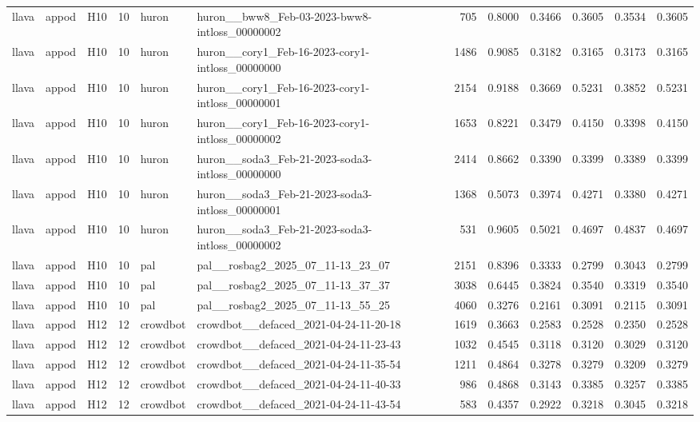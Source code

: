\begin{table}[tbp]
\begin{tabular}{lllrllrrrrrr}
llava & appod & H10 & 10 & huron & huron\_\_bww8\_Feb-03-2023-bww8-intloss\_00000002 & 705 & 0.8000 & 0.3466 & 0.3605 & 0.3534 & 0.3605 \\
llava & appod & H10 & 10 & huron & huron\_\_cory1\_Feb-16-2023-cory1-intloss\_00000000 & 1486 & 0.9085 & 0.3182 & 0.3165 & 0.3173 & 0.3165 \\
llava & appod & H10 & 10 & huron & huron\_\_cory1\_Feb-16-2023-cory1-intloss\_00000001 & 2154 & 0.9188 & 0.3669 & 0.5231 & 0.3852 & 0.5231 \\
llava & appod & H10 & 10 & huron & huron\_\_cory1\_Feb-16-2023-cory1-intloss\_00000002 & 1653 & 0.8221 & 0.3479 & 0.4150 & 0.3398 & 0.4150 \\
llava & appod & H10 & 10 & huron & huron\_\_soda3\_Feb-21-2023-soda3-intloss\_00000000 & 2414 & 0.8662 & 0.3390 & 0.3399 & 0.3389 & 0.3399 \\
llava & appod & H10 & 10 & huron & huron\_\_soda3\_Feb-21-2023-soda3-intloss\_00000001 & 1368 & 0.5073 & 0.3974 & 0.4271 & 0.3380 & 0.4271 \\
llava & appod & H10 & 10 & huron & huron\_\_soda3\_Feb-21-2023-soda3-intloss\_00000002 & 531 & 0.9605 & 0.5021 & 0.4697 & 0.4837 & 0.4697 \\
llava & appod & H10 & 10 & pal & pal\_\_rosbag2\_2025\_07\_11-13\_23\_07 & 2151 & 0.8396 & 0.3333 & 0.2799 & 0.3043 & 0.2799 \\
llava & appod & H10 & 10 & pal & pal\_\_rosbag2\_2025\_07\_11-13\_37\_37 & 3038 & 0.6445 & 0.3824 & 0.3540 & 0.3319 & 0.3540 \\
llava & appod & H10 & 10 & pal & pal\_\_rosbag2\_2025\_07\_11-13\_55\_25 & 4060 & 0.3276 & 0.2161 & 0.3091 & 0.2115 & 0.3091 \\
llava & appod & H12 & 12 & crowdbot & crowdbot\_\_defaced\_2021-04-24-11-20-18 & 1619 & 0.3663 & 0.2583 & 0.2528 & 0.2350 & 0.2528 \\
llava & appod & H12 & 12 & crowdbot & crowdbot\_\_defaced\_2021-04-24-11-23-43 & 1032 & 0.4545 & 0.3118 & 0.3120 & 0.3029 & 0.3120 \\
llava & appod & H12 & 12 & crowdbot & crowdbot\_\_defaced\_2021-04-24-11-35-54 & 1211 & 0.4864 & 0.3278 & 0.3279 & 0.3209 & 0.3279 \\
llava & appod & H12 & 12 & crowdbot & crowdbot\_\_defaced\_2021-04-24-11-40-33 & 986 & 0.4868 & 0.3143 & 0.3385 & 0.3257 & 0.3385 \\
llava & appod & H12 & 12 & crowdbot & crowdbot\_\_defaced\_2021-04-24-11-43-54 & 583 & 0.4357 & 0.2922 & 0.3218 & 0.3045 & 0.3218 \\

\end{tabular}
\end{table}
